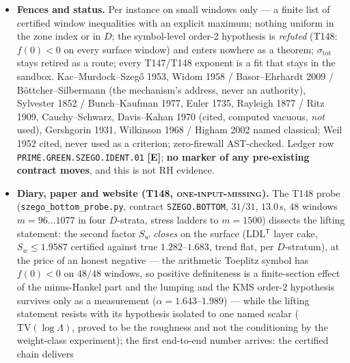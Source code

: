 \documentclass[11pt]{article}
\providecommand{\mE}{\textbf{[E]}}\providecommand{\mC}{\textbf{[C]}}
\begin{document}
\begin{itemize}[leftmargin=1.5em]
entries of the form). The discriminator: on a model section with a genuine order-2 zero
($f(0)=0$, $f''(0)/2=1$ exact), over the ladder $m=64\ldots288$ at matched $\kappa_\Lambda$
(mismatch $0.0013$), the bounded-variation multiplier keeps $\nu$ flat (max/min $1.003$) while
the rough one ($\mathrm{TV}$ larger by $162.6$) grows by $19.9$ --- the roughness, not the
conditioning (control: the first Liouville step $\times10^{-3}$ fails on every mode, provably ---
the step slack is bounded by $\kappa_\Lambda^2$).
\item \textbf{Fences and status.} Per instance on small windows only --- a finite list of
certified window inequalities with an explicit maximum; nothing uniform in the zone index or in
$D$; the symbol-level order-2 hypothesis is \emph{refuted} (T148: $f(0)<0$ on every surface
window) and enters nowhere as a theorem; $\sigma_{\mathrm{tot}}$ stays retired as a route; every
T147/T148 exponent is a fit that stays in the sandbox. Kac--Murdock--Szeg\H{o} 1953, Widom 1958 /
Basor--Ehrhardt 2009 / B\"ottcher--Silbermann (the mechanism's address, never an authority),
Sylvester 1852 / Bunch--Kaufman 1977, Euler 1735, Rayleigh 1877 / Ritz 1909, Cauchy--Schwarz,
Davis--Kahan 1970 (cited, computed vacuous, \emph{not} used), Gershgorin 1931, Wilkinson 1968 /
Higham 2002 named classical; Weil 1952 cited, never used as a criterion; zero-firewall
AST-checked. Ledger row \texttt{PRIME.GREEN.SZEGO.IDENT.01} \mE; \textbf{no marker of any
pre-existing contract moves}, and this is not RH evidence.
\item \textbf{Diary, paper and website (T148, \textsc{one-input-missing}).} The T148 probe
(\texttt{szego\_\allowbreak bottom\_\allowbreak probe.py}, contract \texttt{SZEGO.BOTTOM},
$31/31$, $13.0$\,s, $48$
windows $m=96\ldots1077$ in four $D$-strata, stress ladders to $m=1500$) dissects the lifting
statement: the second factor $S_w$ \emph{closes} on the surface (LDL$^{\mathsf T}$ layer cake,
$S_w\le1.9587$ certified against true $1.282$--$1.683$, trend flat, per $D$-stratum), at the
price of an honest negative --- the arithmetic Toeplitz symbol has $f(0)<0$ on $48/48$ windows,
so positive definiteness is a finite-section effect of the minus-Hankel part and the lumping and
the KMS order-2 hypothesis survives only as a measurement ($\alpha=1.643$--$1.989$) --- while
the lifting statement resists with its hypothesis isolated to one named scalar
($\mathrm{TV}(\log\Lambda)$, proved to be the roughness and not the conditioning by the
weight-class experiment); the first end-to-end number arrives: the certified chain delivers

\end{itemize}
\end{document}
